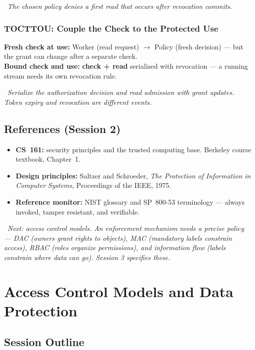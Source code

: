 \documentclass[hidelinks]{article}
\newcommand{\callout}[1]{\par\smallskip\noindent{\color{capri}$\blacktriangleright$}\ \textit{#1}\par\smallskip}
\begin{document}
\callout{The chosen policy denies a first read that occurs after revocation commits.}

\subsubsection{TOCTTOU: Couple the Check to the Protected Use}

\textbf{Fresh check at use:} Worker (read request) $\to$ Policy (fresh decision) --- but the grant can change after a separate check.\\[2pt]
\textbf{Bound check and use:} \textbf{check + read} serialized with revocation --- a running stream needs its own revocation rule.

\callout{Serialize the authorization decision and read admission with grant updates. Token expiry and revocation are different events.}

\subsection{References (Session 2)}

\begin{itemize}
    \item \textbf{CS~161:} security principles and the trusted computing base. Berkeley course textbook, Chapter~1.
    \item \textbf{Design principles:} Saltzer and Schroeder, \textit{The Protection of Information in Computer Systems}, Proceedings of the IEEE, 1975.
    \item \textbf{Reference monitor:} NIST glossary and SP~800-53 terminology --- always invoked, tamper resistant, and verifiable.
\end{itemize}

\callout{Next: access control models. An enforcement mechanism needs a precise policy --- DAC (owners grant rights to objects), MAC (mandatory labels constrain access), RBAC (roles organize permissions), and information flow (labels constrain where data can go). Session 3 specifies these.}

\newpage
\section{Access Control Models and Data Protection}

\subsection{Session Outline}
\end{document}
